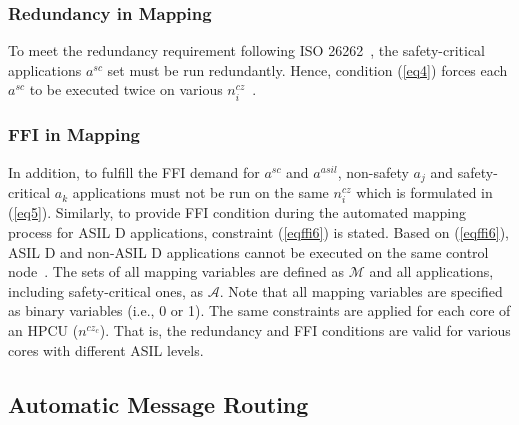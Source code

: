     \subsubsection{Redundancy in Mapping}
    To meet the redundancy requirement following ISO 26262~\cite{iso26262}, the safety-critical applications $a^{sc}$ set must be run redundantly. Hence, condition (\ref{eq4}) forces each $a^{sc}$ to be executed twice on various $n_{i}^{cz}$~\cite{askaripoor2023designer,askaripoor2022architecture}. 
    \subsubsection{FFI in Mapping}
    In addition, to fulfill the FFI demand for $a^{sc}$ and $a^{asil}$, non-safety $a_j$ and safety-critical $a_{k}$ applications must not be run on the same $n_{i}^{cz}$ which is formulated in (\ref{eq5}). Similarly, to provide FFI condition during the automated mapping process for ASIL D applications, constraint (\ref{eqffi6}) is stated. Based on (\ref{eqffi6}), ASIL D and non-ASIL D applications cannot be executed on the same control node~\cite{askaripoor2022architecture,askaripoor2023designer}.
      The sets of all mapping variables are defined as $\mathcal{M}$ and all applications, including safety-critical ones, as $\mathcal{A}$. Note that all mapping variables are specified as binary variables (i.e., 0 or 1). The same constraints are applied for each core of an HPCU ($n^{cz_c}$). That is, the redundancy and FFI conditions are valid for various cores with different ASIL levels.   %
    
    

  
    
    \subsection{Automatic Message Routing}
    
